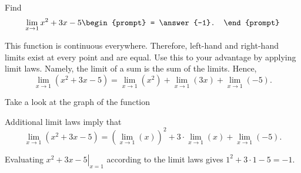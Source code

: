 \documentclass{ximera}
\author{Gregory Hartman \and Matthew Carr}
\begin{document}
\begin{exercise}


  
  
  Find 
  \[
  \displaystyle \lim_{x\to 1} x^2+3x-5 
  \begin{prompt}
  = \answer{-1}.
  \end{prompt}
  \]
  
   \begin{hint}
      This function is continuous everywhere. Therefore, left-hand and right-hand limits exist at every point and are equal. Use this to your advantage by applying limit laws. Namely, the limit of a sum is the sum of the limits. Hence, 
    \[
    \lim_{x\to 1} \left( x^2+3x-5 \right)  
    = \lim_{x\to 1} \left( x^2 \right) +
    \lim_{x\to 1} \left( 3x \right) +
    \lim_{x\to 1} \left( -5 \right).
    \]
    \end{hint}
    
     \begin{hint}
    Take a look at the graph of the function
    \begin{center}
      \end{center}
    Additional limit laws imply that
    \[
    \lim_{x\to 1} \left( x^2+3x-5 \right)  
    = \left( \lim_{x\to 1} \left( x \right) \right)^2 +
    3 \cdot \lim_{x\to 1} \left( x \right) +
    \lim_{x\to 1} \left( -5 \right).
    \]
    \end{hint}
    \begin{hint}
     Evaluating $\left.x^2+3x-5\right|_{x=1}$ according to the limit laws gives $1^2+3\cdot1-5=-1$.
    \end{hint}
    
\end{exercise}
\end{document}
